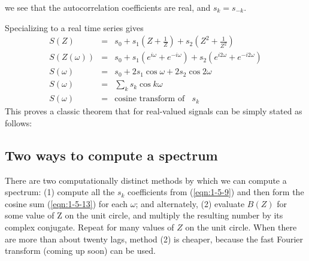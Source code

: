 we see that the autocorrelation coefficients are real,
and $s_k=s_{-k}$.
\par
Specializing to a real time series gives
\begin{eqnarray}
S(Z) & = & s_0 + s_1\left(Z+\frac{1}{Z}     \right) +
		 s_2\left(Z^2 +\frac{1}{Z^2}\right) 		\\
S(Z(\omega )) & = & s_0 + s_1(e^{i\omega} + e^{-i\omega}) +
		s_2(e^{i2\omega} + e^{-i2\omega})		\\
S(\omega ) & = & s_0 + 2s_1\cos \omega + 2s_2 \cos 2\omega	\\
S(\omega ) & = & \sum_{k} s_k \cos k\omega
						\label{eqn:1-5-13} \\
S(\omega ) & = & \mbox{cosine transform of }\;\; s_k
\label{eqn:1-5-14}
\end{eqnarray}
This proves a classic theorem that for real-valued signals
can be simply stated as follows:
\par
{}

\subsection{Two ways to compute a spectrum}
There are two computationally distinct methods 
by which we can
compute a spectrum: (1) compute all the $s_k$ coefficients
from (\ref{eqn:1-5-9}) and
then form the cosine sum (\ref{eqn:1-5-13}) for each $\omega$; and
alternately, (2) evaluate $B(Z)$ for some value of Z on the unit circle,
and multiply the resulting number by its complex conjugate.
Repeat for many values of $Z$ on the unit circle.
When there are more than about twenty lags,
method (2) is cheaper, because
the fast Fourier transform (coming up soon) can be used.

